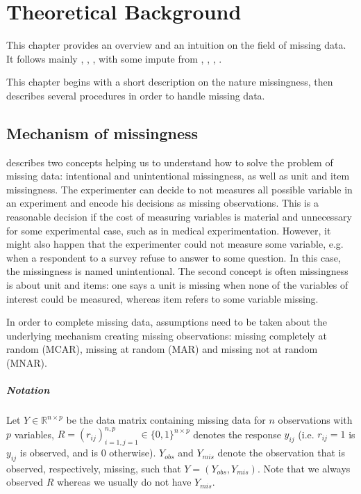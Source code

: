 \chapter{Theoretical Background}

This chapter provides an overview and an intuition on the field of missing
data. It follows mainly \cite{schafer2002missing},
\cite{little2002statistical}, \cite{van2012flexible}, with some impute from
\cite{wikipediaImputation2015}, \cite{matloffblog2015}, \cite{gelman2006data},
\cite{troyanskaya2001missing}.

This chapter begins with a short description on the nature missingness, then
describes several procedures in order to handle missing data.

\section{Mechanism of missingness}
\label{sec:source-missingness}

\cite{van2012flexible} describes two concepts helping us to understand how to
solve the problem of missing data: intentional and unintentional missingness,
as well as unit and item missingness. The experimenter can decide to not
measures all possible variable in an experiment and encode his decisions as
missing observations. This is a reasonable decision if the cost of measuring
variables is material and unnecessary for some experimental case, such as in
medical experimentation. However, it might also happen that the experimenter
could not measure some variable, e.g. when a respondent to a survey refuse to
answer to some question. In this case, the missingness is named
unintentional. The second concept is often missingness is about unit and items:
one says a unit is missing when none of the variables of interest could be
measured, whereas item refers to some variable missing.

In order to complete missing data, assumptions need to be taken about the
underlying mechanism creating missing observations: missing completely at
random (MCAR), missing at random (MAR) and missing not at random (MNAR).

\paragraph{Notation}

Let $Y \in \mathbb{R}^{n\times p}$ be the data matrix containing missing data
for $n$ observations with $p$ variables,
$R = (r_{ij})_{i=1,j=1}^{n,p} \in \{0, 1\}^{n\times p}$ denotes the response
$y_{ij}$ (i.e. $r_{ij} = 1$ is $y_{ij}$ is observed, and is $0$
otherwise). $Y_{obs}$ and $Y_{mis}$ denote the observation that is observed,
respectively, missing, such that $Y=(Y_{obs}, Y_{mis})$. Note that we always
observed $R$ whereas we usually do not have $Y_{mis}$.

